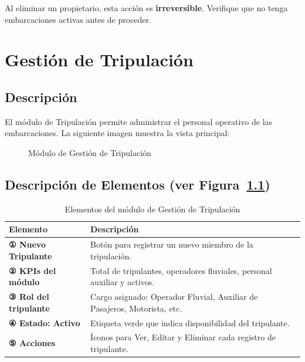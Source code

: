 \documentclass[12pt,a4paper]{report}
\begin{document}
\begin{advertenciabox}
Al eliminar un propietario, esta acción es \textbf{irreversible}. Verifique que no tenga embarcaciones activas antes de proceder.
\end{advertenciabox}

\chapter{Gestión de Tripulación}

\section{Descripción}

El módulo de Tripulación permite administrar el personal operativo de las embarcaciones. La siguiente imagen muestra la vista principal:

\begin{figure}[H]
  \centering
  \fbox{\rule{0pt}{4cm}\hspace{10cm}}
  \caption{Módulo de Gestión de Tripulación}
  \label{fig:tripulacion}
\end{figure}

\section{Descripción de Elementos (ver Figura~\ref{fig:tripulacion})}

\begin{table}[H]
  \centering
  \renewcommand{\arraystretch}{1.4}
  \begin{tabularx}{\textwidth}{@{}L{5cm} X@{}}
    \toprule
    \textbf{Elemento} & \textbf{Descripción} \\
    \midrule
    \textbf{① Nuevo Tripulante} & Botón para registrar un nuevo miembro de la tripulación. \\
    \textbf{② KPIs del módulo} & Total de tripulantes, operadores fluviales, personal auxiliar y activos. \\
    \textbf{③ Rol del tripulante} & Cargo asignado: Operador Fluvial, Auxiliar de Pasajeros, Motorista, etc. \\
    \textbf{④ Estado: Activo} & Etiqueta verde que indica disponibilidad del tripulante. \\
    \textbf{⑤ Acciones} & Íconos para Ver, Editar y Eliminar cada registro de tripulante. \\
    \bottomrule
  \end{tabularx}
  \caption{Elementos del módulo de Gestión de Tripulación}
\end{table}
\end{document}
